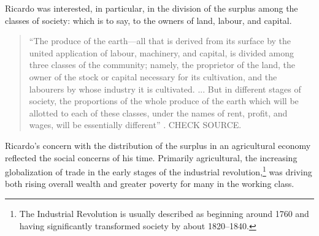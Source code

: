 Ricardo was interested, in particular, in the division of the surplus among the classes of society:  which is to say, to the owners of land, labour, and capital.\begin{quotation}
 ``The produce of the earth---all that is derived from its surface by the united application of labour, machinery, and capital, is divided among three classes of the community; namely, the proprietor of the land, the owner of the stock or capital necessary for its cultivation, and the labourers by whose industry it is cultivated. ...  But in different stages of society, the proportions of the whole produce of the earth which will be allotted to each of these classes, under the names of rent, profit, and wages, will be essentially different''  \cite{ricardoEssayInfluenceLow1815}. CHECK SOURCE.
\end{quotation}
Ricardo's concern with the distribution of the surplus in an agricultural economy reflected the social concerns of his time. Primarily agricultural, the increasing globalization of trade in the early stages of the industrial revolution,\footnote{The Industrial Revolution is usually described as beginning around 1760 and having significantly transformed society by about 1820--1840.} was driving both rising overall wealth and greater poverty for many in the working class.


